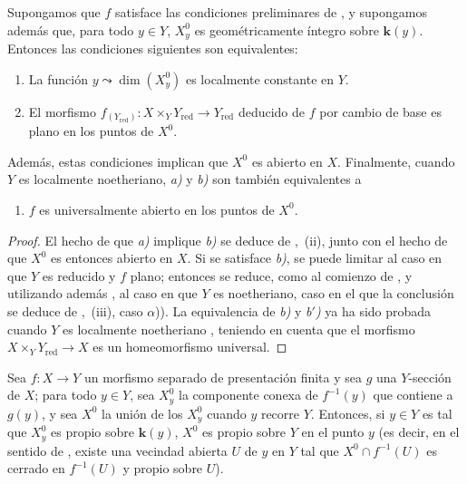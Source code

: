 \begin{corollary}[15.6.7]
\label{IV.15.6.7}
Supongamos que $f$ satisface las condiciones preliminares de , y supongamos además que, para todo $y\in Y$, $X_y^0$ es geométricamente íntegro sobre $\boldsymbol{k}(y)$.
Entonces las condiciones siguientes son equivalentes:
\begin{enumerate}[label=\emph{\alph*)}]
  \item La función $y\leadsto\dim(X_y^0)$ es localmente constante en $Y$.
  \item El morfismo $f_{(Y_{\mathrm{red}})}:X\times_Y Y_{\mathrm{red}}\to Y_{\mathrm{red}}$ deducido de $f$ por cambio de base es plano en los puntos de $X^0$.
\end{enumerate}
Además, estas condiciones implican que $X^0$ es abierto en $X$.
Finalmente, cuando $Y$ es localmente noetheriano, \emph{a)} y \emph{b)} son también equivalentes a
\begin{enumerate}
  \item[\rm b$'$)] $f$ es universalmente abierto en los puntos de $X^0$.
\end{enumerate}
\end{corollary}

\begin{proof}
El hecho de que \emph{a)} implique \emph{b)} se deduce de ,~(ii), junto con el hecho de que $X^0$ es entonces abierto en $X$.
Si se satisface \emph{b)}, se puede limitar al caso en que $Y$ es reducido y $f$ plano; entonces se reduce, como al comienzo de , y utilizando además , al caso en que $Y$ es noetheriano, caso en el que la conclusión se deduce de ,~(iii), caso $\alpha$)).
La equivalencia de \emph{b)} y \emph{b$'$)} ya ha sido probada cuando $Y$ es localmente noetheriano , teniendo en cuenta que el morfismo $X\times_Y Y_{\mathrm{red}}\to X$ es un homeomorfismo universal.
\end{proof}

\begin{proposition}[15.6.8]
\label{IV.15.6.8}
Sea $f:X\to Y$ un morfismo separado de presentación finita y sea $g$ una $Y$-sección de $X$; para todo $y\in Y$, sea $X_y^0$ la componente conexa de $f^{-1}(y)$ que contiene a $g(y)$, y sea $X^0$ la unión de los $X_y^0$ cuando $y$ recorre $Y$.
Entonces, si $y\in Y$ es tal que $X_y^0$ es propio sobre $\boldsymbol{k}(y)$, $X^0$ es propio sobre $Y$ en el punto $y$ \textup{(es decir, en el sentido de , existe una vecindad abierta $U$ de $y$ en $Y$ tal que $X^0\cap f^{-1}(U)$ es cerrado en $f^{-1}(U)$ y propio sobre $U$)}.
\end{proposition}

